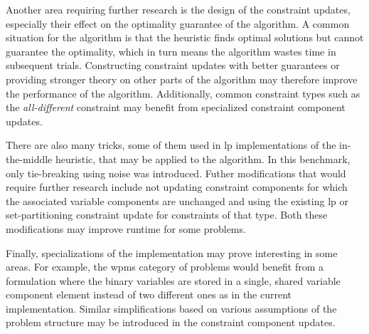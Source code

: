 Another area requiring further research is the design of the constraint updates, especially their effect on the optimality guarantee of the algorithm.
A common situation for the algorithm is that the heuristic finds optimal solutions but cannot guarantee the optimality, which in turn means the algorithm wastes time in subsequent trials.
Constructing constraint updates with better guarantees or providing stronger theory on other parts of the algorithm may therefore improve the performance of the algorithm.
Additionally, common constraint types such as the \emph{all-different} constraint may benefit from specialized constraint component updates.

There are also many tricks, some of them used in \gls{lp} implementations of the in-the-middle heuristic, that may be applied to the algorithm.
In this benchmark, only tie-breaking using noise was introduced.
Futher modifications that would require further research include not updating constraint components for which the associated variable components are unchanged and using the existing \gls{lp} or set-partitioning constraint update \parencite[\pno~102]{Wedelin08} for constraints of that type.
Both these modifications may improve runtime for some problems.

Finally, specializations of the implementation may prove interesting in some areas.
For example, the \gls{wpms} category of problems would benefit from a formulation where the binary variables are stored in a single, shared variable component element instead of two different ones as in the current implementation.
Similar simplifications based on various assumptions of the problem structure may be introduced in the constraint component updates.



